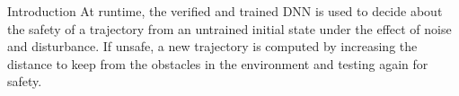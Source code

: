\begin{section}{Introduction}
At runtime, the verified and trained DNN is used to decide about the safety of a trajectory from an untrained initial state under the effect of noise and disturbance.
If unsafe, a new trajectory is computed by increasing the distance to keep from the obstacles in the environment and testing again for safety. 


%



\end{section}
